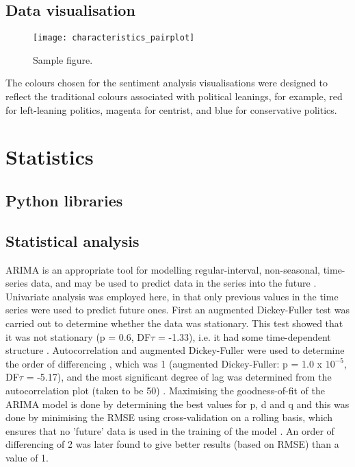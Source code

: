 \documentclass[hidelinks,12pt,oneside]{report} %
\begin{document}
\subsection{Data visualisation}

\begin{figure}[!ht]
	\centering
	\vspace{.4218cm}
		\texttt{[image: characteristics\_pairplot]}	\captionsetup{justification=justified,width=1\linewidth}
	\caption{Sample figure.}
\label{fig:characteristics_pairplot}
\end{figure}

The colours chosen for the sentiment analysis visualisations were designed to reflect the traditional colours associated with political leanings, for example, red for left-leaning politics, magenta for centrist, and blue for conservative politics.

\section{Statistics}
\subsection{Python libraries}


\subsection{Statistical analysis}
ARIMA is an appropriate tool for modelling regular-interval, non-seasonal, time-series data, and may be used to predict data in the series into the future \citep{MSc}. Univariate analysis was employed here, in that only previous values in the time series were used to predict future ones. First an augmented Dickey-Fuller test was carried out to determine whether the data was stationary. This test showed that it was not stationary (p = 0.6, DF$\tau$ = -1.33), i.e. it had some time-dependent structure \citep{DF}. Autocorrelation and augmented Dickey-Fuller were used to determine the order of differencing \citep{Raval}, which was 1 (augmented Dickey-Fuller: p = 1.0 x $10^{-5}$, DF$\tau$ = -5.17), and the most significant degree of lag was determined from the autocorrelation plot (taken to be 50) \citep{Raval, Nadeem}. Maximising the goodness-of-fit of the ARIMA model is done by determining the best values for p, d and q and this was done by minimising the RMSE \citep{Raval, SaS} using cross-validation on a rolling basis, which ensures that no 'future' data is used in the training of the model \citep{SS, Hyn}. An order of differencing of 2 was later found to give better results (based on RMSE) than a value of 1.
\end{document}
